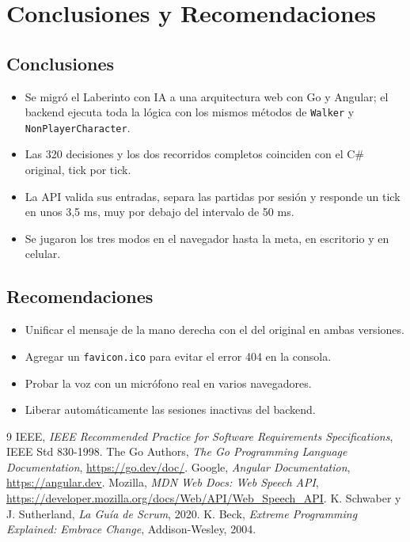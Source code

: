 \documentclass[12pt,a4paper]{article}
\begin{document}
\section{Conclusiones y Recomendaciones}
\subsection{Conclusiones}
\begin{itemize}
 \item Se migró el Laberinto con IA a una arquitectura web con Go y Angular; el
       backend ejecuta toda la lógica con los mismos métodos de \texttt{Walker} y
       \texttt{NonPlayerCharacter}.
 \item Las 320 decisiones y los dos recorridos completos coinciden con el C\#
       original, tick por tick.
 \item La API valida sus entradas, separa las partidas por sesión y responde un
       tick en unos 3,5 ms, muy por debajo del intervalo de 50 ms.
 \item Se jugaron los tres modos en el navegador hasta la meta, en escritorio y en celular.
\end{itemize}

\subsection{Recomendaciones}
\begin{itemize}
 \item Unificar el mensaje de la mano derecha con el del original en ambas versiones.
 \item Agregar un \texttt{favicon.ico} para evitar el error 404 en la consola.
 \item Probar la voz con un micrófono real en varios navegadores.
 \item Liberar automáticamente las sesiones inactivas del backend.
\end{itemize}

\begin{thebibliography}{9}
 IEEE, \emph{IEEE Recommended Practice for Software Requirements Specifications}, IEEE Std 830-1998.
 The Go Authors, \emph{The Go Programming Language Documentation}, \url{https://go.dev/doc/}.
 Google, \emph{Angular Documentation}, \url{https://angular.dev}.
 Mozilla, \emph{MDN Web Docs: Web Speech API}, \url{https://developer.mozilla.org/docs/Web/API/Web_Speech_API}.
 K. Schwaber y J. Sutherland, \emph{La Guía de Scrum}, 2020.
 K. Beck, \emph{Extreme Programming Explained: Embrace Change}, Addison-Wesley, 2004.
\end{thebibliography}
\end{document}
